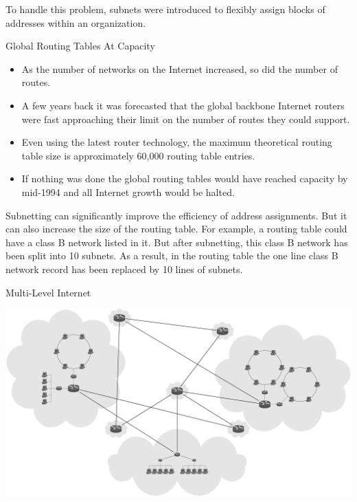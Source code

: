 To handle this problem, subnets were introduced to flexibly assign blocks of addresses within an
organization.

\begin{frame}{Global Routing Tables At Capacity}
  \begin{itemize}
  \item As the number of networks on the Internet increased, so did the number of routes.
  \item A few years back it was forecasted that the global backbone Internet routers were
    fast approaching their limit on the number of routes they could support.
  \item Even using the latest router technology, the maximum theoretical routing table
    size is approximately 60,000 routing table entries.
  \item If nothing was done the global routing tables would have reached capacity by
    mid-1994 and all Internet growth would be halted.
  \end{itemize}
\end{frame}

Subnetting can significantly improve the efficiency of address assignments. But it can
also increase the size of the routing table. For example, a routing table could have a
class B network listed in it. But after subnetting, this class B network has been split
into 10 subnets. As a result, in the routing table the one line class B network record has
been replaced by 10 lines of subnets.


\begin{frame}{Multi-Level Internet}
\begin{center}
  \includegraphics[width=\textwidth]{multi-level-internet}
\end{center}
\end{frame}

